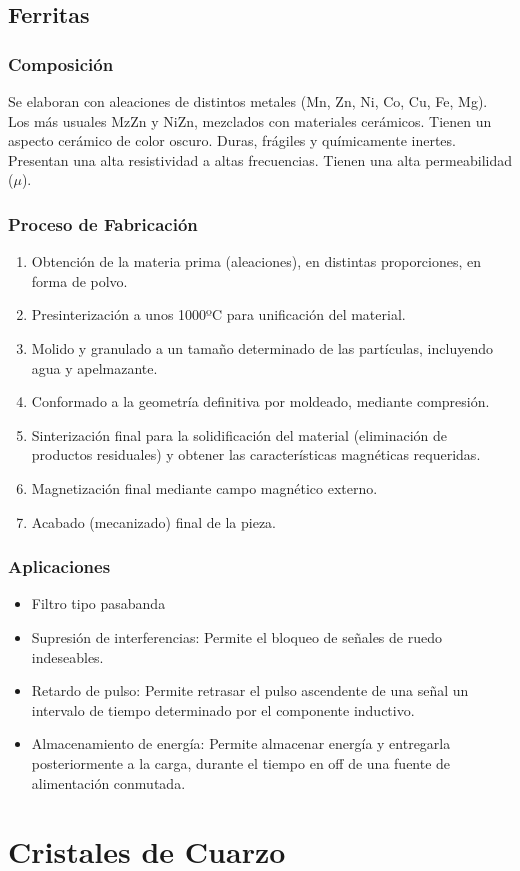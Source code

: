 \subsection{Ferritas}
\subsubsection{Composición}
Se elaboran con aleaciones de distintos metales (Mn, Zn, Ni, Co, Cu, Fe, Mg). Los más usuales MzZn y NiZn, mezclados con materiales cerámicos. Tienen un aspecto cerámico de color oscuro. Duras, frágiles y químicamente inertes. Presentan una alta resistividad a altas frecuencias. Tienen una alta permeabilidad ($\mu$).

\subsubsection{Proceso de Fabricación}

\begin{enumerate}
    \item Obtención de la materia prima (aleaciones), en distintas proporciones, en forma de polvo.
    \item Presinterización a unos 1000ºC para unificación del material.
    \item Molido y granulado a un tamaño determinado de las partículas, incluyendo agua y apelmazante.
    \item Conformado a la geometría definitiva por moldeado, mediante compresión.
    \item Sinterización final para la solidificación del material (eliminación de productos residuales) y obtener las características magnéticas requeridas.
    \item Magnetización final mediante campo magnético externo.
    \item Acabado (mecanizado) final de la pieza.
\end{enumerate}

\subsubsection{Aplicaciones}

\begin{itemize}
    \item Filtro tipo pasabanda
    \item Supresión de interferencias: Permite el bloqueo de señales de ruedo indeseables.
    \item Retardo de pulso: Permite retrasar el pulso ascendente de una señal un intervalo de tiempo determinado por el componente inductivo.
    \item Almacenamiento de energía: Permite almacenar energía y entregarla posteriormente a la carga, durante el tiempo en off de una fuente de alimentación conmutada.
\end{itemize}

\section{Cristales de Cuarzo}